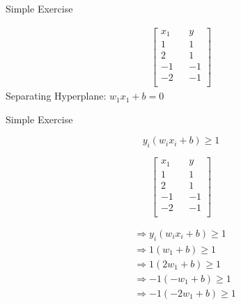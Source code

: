 \documentclass{beamer}
\begin{document}
\begin{frame}{Simple Exercise}

\begin{align*}
\begin{bmatrix}
x_{1} && y \\
1 && 1\\
2 && 1\\
-1 && -1\\
-2 && -1\\
\end{bmatrix}
\end{align*}
Separating Hyperplane: $w_{1}x_{1} + b = 0$
\end{frame}

\begin{frame}{Simple Exercise}
\begin{tcolorbox}

\begin{equation*}
y_{i}(w_{i}x_{i} + b) \geq 1
\end{equation*}
\end{tcolorbox}
\begin{multicols}{2}
\begin{equation*}
\begin{bmatrix}
x_{1} && y \\
1 && 1\\
2 && 1\\
-1 && -1\\
-2 && -1\\
\end{bmatrix}
\end{equation*}\break

\begin{align*}
&\Rightarrow y_{i}(w_{i}x_{i} + b) \geq 1\\
&\Rightarrow 1(w_{1} + b) \geq 1\\
&\Rightarrow 1(2w_{1} + b)\geq 1\\
&\Rightarrow -1(-w_{1}+b) \geq 1\\
&\Rightarrow -1(-2w_{1}+b) \geq 1\\
\end{align*}


\end{multicols}
\end{frame}
\end{document}
